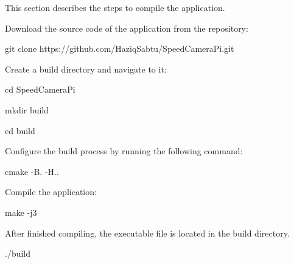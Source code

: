 This section describes the steps to compile the application.


\begin{DoxyItemize}
\item Download the source code of the application from the repository\+: \begin{DoxyVerb}  git clone https://github.com/HaziqSabtu/SpeedCameraPi.git
\end{DoxyVerb}

\item Create a build directory and navigate to it\+: \begin{DoxyVerb}  cd SpeedCameraPi

  mkdir build

  cd build
\end{DoxyVerb}

\item Configure the build process by running the following command\+: \begin{DoxyVerb}  cmake -B. -H..
\end{DoxyVerb}

\item Compile the application\+: \begin{DoxyVerb}  make -j3
\end{DoxyVerb}

\item After finished compiling, the executable file is located in the build directory. \begin{DoxyVerb}  ./build
\end{DoxyVerb}
 
\end{DoxyItemize}